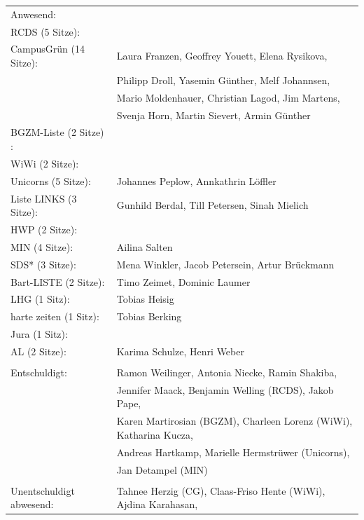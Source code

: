 \documentclass[ngerman,headheight=70pt]{scrartcl}
\begin{document}
    \begin{tabular}{ll}
        Anwesend: & \\
            RCDS (5 Sitze): &  \\
             CampusGrün (14 Sitze): & Laura Franzen, Geoffrey Youett, Elena Rysikova, \\
                                   & Philipp Droll, Yasemin Günther, Melf Johannsen, \\
                                   & Mario Moldenhauer, Christian Lagod, Jim Martens, \\
                                   & Svenja Horn, Martin Sievert, Armin Günther \\
             BGZM-Liste (2 Sitze) : & \\
             WiWi (2 Sitze): & \\
             Unicorns (5 Sitze): &  Johannes Peplow, Annkathrin Löffler \\
             Liste LINKS (3 Sitze): & Gunhild Berdal, Till Petersen, Sinah Mielich \\
             HWP (2 Sitze): &  \\
             MIN (4 Sitze): & Ailina Salten \\
             SDS* (3 Sitze): & Mena Winkler, Jacob Petersein, Artur Brückmann \\
             Bart-LISTE (2 Sitze): & Timo Zeimet, Dominic Laumer \\
             LHG (1 Sitz): & Tobias Heisig \\
             harte zeiten (1 Sitz): & Tobias Berking \\
             Jura (1 Sitz): & \\
             AL (2 Sitze): & Karima Schulze, Henri Weber \\
            & \\
        Entschuldigt: & Ramon Weilinger, Antonia Niecke, Ramin Shakiba, \\
                      & Jennifer Maack, Benjamin Welling (RCDS), Jakob Pape, \\
                      & Karen Martirosian (BGZM), Charleen Lorenz (WiWi), Katharina Kucza, \\
                      & Andreas Hartkamp, Marielle Hermstrüwer (Unicorns), \\
                      & Jan Detampel (MIN) \\
                      &\\
        Unentschuldigt abwesend: & Tahnee Herzig (CG), Claas-Friso Hente (WiWi), Ajdina Karahasan,\\

\end{tabular}
\end{document}
